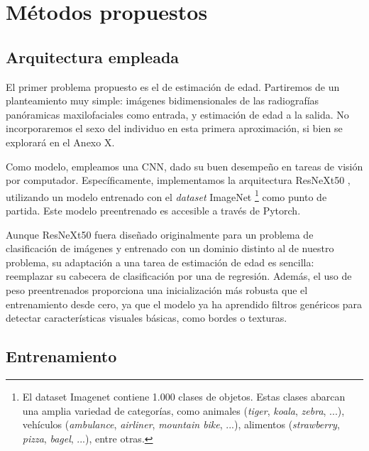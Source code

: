 
\section{Métodos propuestos}

\subsection{Arquitectura empleada}

El primer problema propuesto es el de estimación de edad. Partiremos de un planteamiento muy simple: imágenes 
bidimensionales de las radiografías panóramicas maxilofaciales como entrada, y estimación de edad a la salida.
No incorporaremos el sexo del individuo en esta primera aproximación, si bien se explorará en el Anexo X. 

Como modelo, empleamos una CNN, dado su buen desempeño en tareas de visión por computador. Específicamente,
implementamos la arquitectura ResNeXt50 \cite{xie2017}, utilizando un modelo entrenado con el \textit{dataset} 
ImageNet
\footnote{
    El dataset Imagenet contiene 1.000 clases de objetos. Estas clases abarcan una
    amplia variedad de categorías, como animales (\textit{tiger}, \textit{koala}, \textit{zebra}, ...), 
    vehículos (\textit{ambulance}, \textit{airliner}, \textit{mountain bike}, ...), alimentos 
    (\textit{strawberry}, \textit{pizza}, \textit{bagel}, ...), entre otras. 
}
\cite{deng2009} como punto de partida. Este modelo preentrenado es accesible a través de Pytorch. 

Aunque ResNeXt50 fuera diseñado originalmente para un problema de clasificación de imágenes y entrenado con
un dominio distinto al de nuestro problema, su adaptación a una tarea de estimación de edad es sencilla: 
reemplazar su cabecera de clasificación por una de regresión. Además, el uso de peso preentrenados proporciona
una inicialización más robusta que el entrenamiento desde cero, ya que el modelo ya ha aprendido filtros 
genéricos para detectar características visuales básicas, como bordes o texturas.



\subsection{Entrenamiento}



